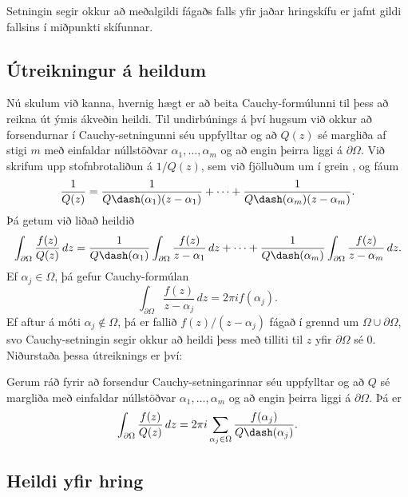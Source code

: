Setningin segir okkur að meðalgildi fágaðs falls yfir jaðar
hringskífu er jafnt gildi fallsins í miðpunkti skífunnar.


\subsection*{Útreikningur á heildum}

Nú skulum við kanna, hvernig hægt er að beita Cauchy-formúlunni til
þess að reikna út ýmis ákveðin heildi.  Til undirbúnings á því hugsum
við okkur að forsendurnar í Cauchy-setningunni séu uppfylltar og að
$Q(z)$ sé margliða af stigi $m$ með einfaldar núllstöðvar
$\alpha_1,\dots,\alpha_m$ og að engin þeirra liggi á
$\partial\Omega$.  Við skrifum upp stofnbrotaliðun á $1/Q(z)$, sem
við fjölluðum um í grein , og fáum 
 $$\dfrac 1{Q(z)} = \dfrac 1{Q\dash(\alpha_1)(z-\alpha_1)}+\cdots+
\dfrac 1{Q\dash(\alpha_m)(z-\alpha_m)}.
 $$
Þá getum við liðað heildið
 $$\int_{\partial\Omega}\dfrac{f(z)}{Q(z)}\, dz =
\dfrac 1{Q\dash(\alpha_1)}\int_{\partial\Omega}\dfrac{f(z)}{z-\alpha_1}\,
dz 
+\cdots+
\dfrac 1{Q\dash(\alpha_m)}\int_{\partial\Omega}\dfrac{f(z)}{z-\alpha_m}\,
dz. 
 $$
Ef $\alpha_j\in \Omega$, þá gefur Cauchy-formúlan
$$
\int_{\partial\Omega}\dfrac{f(z)}{z-\alpha_j}\,
dz  = 2\pi i f(\alpha_j).
$$
Ef aftur á móti $\alpha_j\not\in\Omega$, þá er fallið
$f(z)/(z-\alpha_j)$ fágað í grennd um $\Omega\cup\partial\Omega$, svo
Cauchy-setningin segir okkur að heildi þess með tilliti til $z$ yfir
$\partial\Omega$ sé $0$.  Niðurstaða þessa útreiknings er því:

\begin{se}\label{set10.2.6}
Gerum ráð fyrir að forsendur Cauchy-setningarinnar séu uppfylltar og
að $Q$ sé margliða með einfaldar núllstöðvar
$\alpha_1,\dots,\alpha_m$ og að engin þeirra liggi á
$\partial\Omega$.  Þá er
 \begin{equation*}\int_{\partial\Omega} \dfrac{f(z)}{Q(z)} \, dz =
2\pi i\sum_{\alpha_j\in \Omega}
\dfrac{f(\alpha_j)}{Q\dash(\alpha_j)}.
\label{10.2.10}
 \end{equation*}
\end{se}

\subsection*{Heildi yfir hring}


